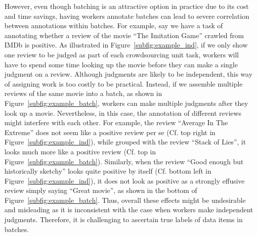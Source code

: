 However, even though batching is an attractive option in practice
due to its cost and time savings, having workers annotate batches can lead to severe correlation between annotations within batches.  
For example, say we have a task of annotating whether a review of the movie ``The Imitation Game'' crawled from IMDb is positive.
As illustrated in Figure~\ref{subfig:example_ind}, if we only show one review to be judged as part of each crowdsourcing unit task,
workers will have to spend some time 
looking up the movie 
before they can make a single judgment on a review.
Although judgments are likely to be independent, 
this way of assigning work is too costly to be practical.
Instead, if we assemble multiple reviews of the same movie into a batch, as shown in Figure~\ref{subfig:example_batch},
workers can make multiple judgments after they look up a movie.  
Nevertheless, in this case, the annotation of different reviews might interfere with each other.
For example, the review ``Average In The Extreme'' does not seem like a positive review per se (Cf. top right in Figure~\ref{subfig:example_ind}),
while grouped with the review ``Stack of Lies'', it looks much more like a positive review (Cf. top in Figure~\ref{subfig:example_batch}).
Similarly, when the review ``Good enough but historically sketchy'' looks quite positive by itself (Cf. bottom left in Figure~\ref{subfig:example_ind}),
it does not look as positive as a strongly effusive review simply saying ``Great movie'', as shown in the bottom of Figure~\ref{subfig:example_batch}.
Thus, overall these effects might be undesirable and misleading as it is inconsistent with the case when workers make independent judgments.
Therefore, it is challenging to ascertain true labels of data items in batches.




